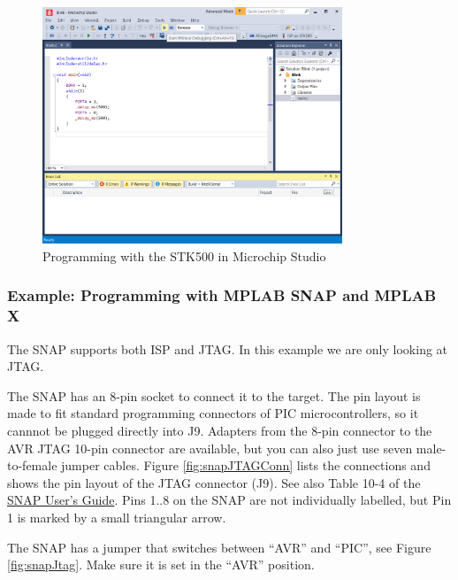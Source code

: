 \documentclass{article}
\newenvironment{caution}{\begin{tcolorbox}[colback=red!5!white,colframe=red!75!black,title=\textbf{Caution}]}{\end{tcolorbox}}
\begin{document}
\begin{figure}[htb]
\centering
\includegraphics[width=0.8\textwidth]{Pictures/STK500MchpStudio4.png}
\caption{Programming with the STK500 in Microchip Studio}
\label{fig:stk500MchpStudio4}
\end{figure}
\FloatBarrier

\subsubsection{Example: Programming with MPLAB SNAP and MPLAB X}\label{sec:exSnap}
The SNAP supports both ISP and JTAG. In this example we are only looking at JTAG. 

The SNAP has an 8-pin socket to connect it to the target. The pin layout is made to fit standard programming connectors of PIC microcontrollers, so it cannnot be plugged directly into J9. Adapters from the 8-pin connector to the AVR JTAG 10-pin connector are available, but you can also just use seven male-to-female jumper cables. Figure \ref{fig:snapJTAGConn} lists the connections and shows the pin layout of the JTAG connector (J9). See also Table 10-4 of the \href{https://ww1.microchip.com/downloads/aemDocuments/documents/DEV/ProductDocuments/UserGuides/50002787C.pdf}{SNAP User's Guide}. Pins 1..8 on the SNAP are not individually labelled, but Pin 1 is marked by a small triangular arrow. 

\begin{caution}
The SNAP has a jumper that switches between ``AVR'' and ``PIC'', see Figure \ref{fig:snapJtag}. Make sure it is set in the ``AVR'' position. 
\end{caution}
\end{document}
